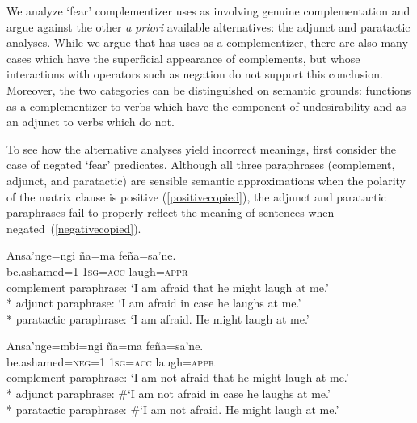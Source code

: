 \documentclass[output=paper,colorlinks,citecolor=brown]{langscibook}
\begin{document}
We analyze `fear' complementizer uses as involving genuine complementation and argue against the other \textit{a priori} available alternatives: the adjunct and paratactic analyses. %
While we argue that  has uses as a complementizer, there are also many cases which have the superficial appearance of complements, but whose interactions with operators such as negation do not support this conclusion. {Moreover, the two categories can be distinguished on semantic grounds:  functions as a complementizer to verbs which have the component of undesirability and as an adjunct to verbs which do not.}

To see how the alternative analyses yield incorrect meanings, first consider the case of negated `fear' predicates. Although all three paraphrases (complement, adjunct, and paratactic) are sensible semantic approximations when the polarity of the matrix clause is positive (\ref{positivecopied}), the adjunct and paratactic paraphrases fail to properly reflect the meaning of  sentences when negated~(\ref{negativecopied}).
\begin{exe}
    \ex \label{positivecopied}
    \gll Ansa'nge=ngi        {\ob}ña=ma       feña=sa'ne.{\cb} \\
         {be.ashamed=\textsc{1}} \textsc{1sg=acc} laugh=\textsc{appr} \\
    \glt complement paraphrase: `I am afraid that he might laugh at me.'\footnotemark\\*
         adjunct paraphrase: `I am afraid in case he laughs at me.' \\*    
         paratactic paraphrase: `I am afraid. He might laugh at me.'


    \ex \label{negativecopied}
    \gll Ansa'nge=mbi=ngi        {\ob}ña=ma       feña=sa'ne.{\cb} \\
         {be.ashamed=\textsc{neg=1}} \textsc{1sg=acc} laugh=\textsc{appr} \\
    \glt complement paraphrase: `I am not afraid that he might laugh at me.' \\*
         adjunct paraphrase: \#`I am not afraid in case he laughs at me.' \\*   
         paratactic paraphrase: \#`I am not afraid. He might laugh at me.' 
\end{exe}
\end{document}
